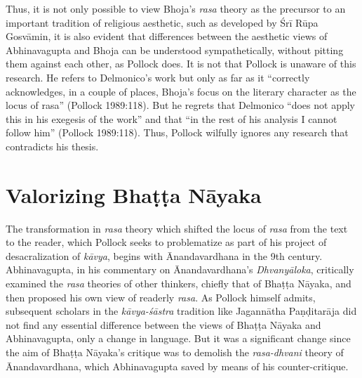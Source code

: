 Thus, it is not only possible to view Bhoja's \textsl{rasa} theory as the precursor to an important tradition of religious aesthetic, such as developed by Śrī Rūpa Gosvāmin, it is also evident that differences between the aesthetic views of Abhinavagupta and Bhoja can be understood sympathetically, without pitting them against each other, as Pollock does. It is not that Pollock is unaware of this research. He refers to Delmonico's work but only as far as it ``correctly acknowledges, in a couple of places, Bhoja's focus on the literary character as the locus of rasa'' (Pollock 1989:118). But he regrets that Delmonico ``does not apply this in his exegesis of the work'' and that ``in the rest of his analysis I cannot follow him'' (Pollock 1989:118). Thus, Pollock wilfully ignores any research that contradicts his thesis.

\section*{Valorizing Bhaṭṭa Nāyaka}

The transformation in \textsl{rasa} theory which shifted the locus of \textsl{rasa} from the text to the reader, which Pollock seeks to problematize as part of his project of desacralization of \textsl{kāvya}, begins with Ānandavardhana in the 9th century. Abhinavagupta, in his commentary on Ānandavardhana's \textsl{Dhvanyāloka}, critically examined the \textsl{rasa} theories of other thinkers, chiefly that of Bhaṭṭa Nāyaka, and then proposed his own view of readerly \textsl{rasa}. As Pollock himself admits, subsequent scholars in the \textsl{kāvya-śāstra} tradition like Jagannātha Paṇḍitarāja did not find any essential difference between the views of Bhaṭṭa Nāyaka and Abhinavagupta, only a change in language. But it was a significant change since the aim of Bhaṭṭa Nāyaka's critique was to demolish the \textsl{rasa-dhvani} theory of Ānandavardhana, which Abhinavagupta saved by means of his counter-critique. 

